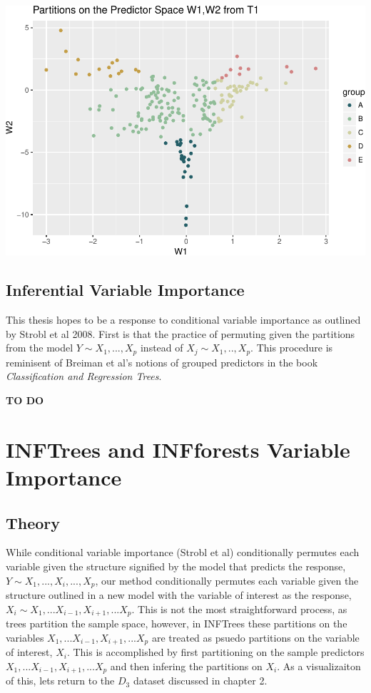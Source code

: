 \documentclass[12pt,twoside]{reedthesis}
\begin{document}
  \includegraphics{Thesis_files/figure-latex/unnamed-chunk-3-1.pdf}
  
  \section{Inferential Variable
  Importance}\label{inferential-variable-importance}
  
  This thesis hopes to be a response to conditional variable importance as
  outlined by Strobl et al 2008. First is that the practice of permuting
  given the partitions from the model \(Y \sim X_1,...,X_p\) instead of
  \(X_j \sim X_1,..,X_p\). This procedure is reminisent of Breiman et al's
  notions of grouped predictors in the book \emph{Classification and
  Regression Trees}.
  
  \textbf{TO DO}
  
  \chapter{INFTrees and INFforests Variable
  Importance}\label{inftrees-and-infforests-variable-importance}
  
  \section{Theory}\label{theory}
  
  While conditional variable importance (Strobl et al) conditionally
  permutes each variable given the structure signified by the model that
  predicts the response, \(Y \sim X_1,...,X_i,...,X_p\), our method
  conditionally permutes each variable given the structure outlined in a
  new model with the variable of interest as the response,
  \(X_i \sim X_1,...X_{i-1},X_{i+1},...X_p\). This is not the most
  straightforward process, as trees partition the sample space, however,
  in INFTrees these partitions on the variables
  \(X_1,...X_{i-1},X_{i+1},...X_p\) are treated as psuedo partitions on
  the variable of interest, \(X_i\). This is accomplished by first
  partitioning on the sample predictors \(X_1,...X_{i-1},X_{i+1},...X_p\)
  and then infering the partitions on \(X_i\). As a visualizaiton of this,
  lets return to the \(D_{3}\) dataset discussed in chapter 2.
  
\end{document}
